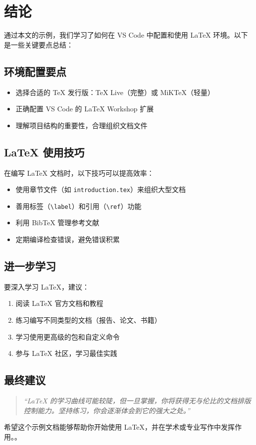 \section{结论}%
\label{sec:conclusion}

通过本文的示例，我们学习了如何在 VS Code 中配置和使用 LaTeX 环境。以下是一些关键要点总结：

\subsection{环境配置要点}
\begin{itemize}
    \item 选择合适的 TeX 发行版：TeX Live（完整）或 MiKTeX（轻量）
    \item 正确配置 VS Code 的 LaTeX Workshop 扩展
    \item 理解项目结构的重要性，合理组织文档文件
\end{itemize}

\subsection{LaTeX 使用技巧}
在编写 LaTeX 文档时，以下技巧可以提高效率：

\begin{itemize}
    \item 使用章节文件（如 \verb|introduction.tex|）来组织大型文档
    \item 善用标签（\verb|\label|）和引用（\verb|\ref|）功能
    \item 利用 BibTeX 管理参考文献
    \item 定期编译检查错误，避免错误积累
\end{itemize}

\subsection{进一步学习}
要深入学习 LaTeX，建议：

\begin{enumerate}
    \item 阅读 LaTeX 官方文档和教程
    \item 练习编写不同类型的文档（报告、论文、书籍）
    \item 学习使用更高级的包和自定义命令
    \item 参与 LaTeX 社区，学习最佳实践
\end{enumerate}

\subsection{最终建议}
\begin{quote}
\textit{``LaTeX 的学习曲线可能较陡，但一旦掌握，你将获得无与伦比的文档排版控制能力。坚持练习，你会逐渐体会到它的强大之处。''}
\end{quote}

希望这个示例文档能够帮助你开始使用 LaTeX，并在学术或专业写作中发挥作用\cite{chen2005chinese}。。
